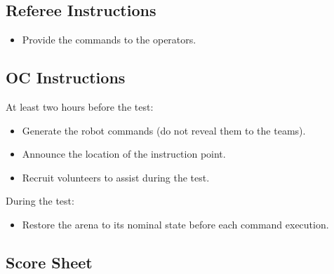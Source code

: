 \subsection*{Referee Instructions}
\begin{itemize}[nosep]
	\item Provide the commands to the operators.
\end{itemize}

\subsection*{OC Instructions}

At least two hours before the test:
\begin{itemize}[nosep]
	\item Generate the robot commands (do not reveal them to the teams).
	\item Announce the location of the instruction point.
	\item Recruit volunteers to assist during the test.
	\newline
\end{itemize}

\noindent During the test:
\begin{itemize}[nosep]
	\item Restore the arena to its nominal state before each command execution.
\end{itemize}

\subsection*{Score Sheet}


